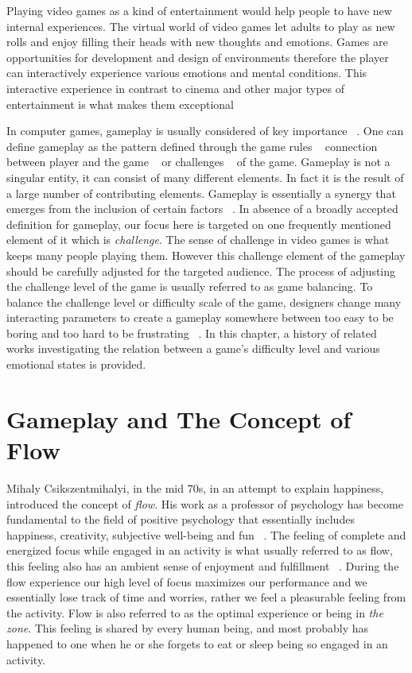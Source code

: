 
Playing video games as a kind of entertainment would help people to have new internal experiences. The virtual world of video games let adults to play as new rolls and enjoy filling their heads with new thoughts and emotions. Games are opportunities for development and design of environments therefore the player can interactively experience various emotions and mental conditions. This interactive experience in contrast to cinema and other major types of entertainment is what makes them exceptional

In computer games, gameplay is usually considered of key importance ~\cite{rollings2006fundamentals, malone1982makes}. One can define gameplay as the pattern defined through the game rules ~\cite{salen2004rules, pajares2008understanding} connection between player and the game ~\cite{laramee2002game} or challenges ~\cite{rollings2003andrew} of the game. Gameplay is not a singular entity, it can consist of many different elements. In fact it is the result of a large number of contributing elements. Gameplay is essentially a synergy that emerges from the inclusion of certain factors ~\cite{rollings2003andrew}. In absence of a broadly accepted definition for gameplay, our focus here is targeted on one frequently mentioned element of it which is \textit{challenge}. The sense of challenge in video games is what keeps many people playing them. However this challenge element of the gameplay should be carefully adjusted for the targeted audience. The process of adjusting the challenge level of the game is usually referred to as game balancing. To balance the challenge level or difficulty scale of the game, designers change many interacting parameters to create a gameplay somewhere between too easy to be boring and too hard to be frustrating ~\cite{koster2013theory}. In this chapter, a history of related works investigating the relation between a game's difficulty level and various emotional states is provided.

\section{Gameplay and The Concept of Flow}
Mihaly Csikszentmihalyi, in the mid 70s, in an attempt to explain happiness, introduced the concept of \textit{flow}. His work as a professor of psychology has become fundamental to the field of positive psychology that essentially includes happiness, creativity, subjective well-being and fun ~\cite{csikszentmihalyi1990flow}. The feeling of complete and energized focus while engaged in an activity is what usually referred to as flow, this feeling also has an ambient sense of enjoyment and fulfillment ~\cite{csikszentmihalyi1990flow}. During the flow experience our high level of focus maximizes our performance and we essentially lose track of time and worries, rather we feel a pleasurable feeling from the activity. Flow is also referred to as the optimal experience or being in \textit{the zone}. This feeling is shared by every human being, and most probably has happened to one when he or she forgets to eat or sleep being so engaged in an activity.

